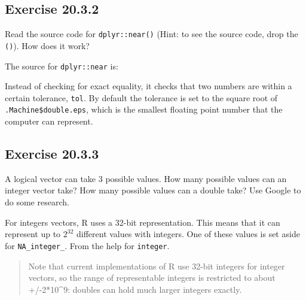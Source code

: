 \documentclass[]{book}
\newenvironment{Shaded}{\begin{snugshade}}{\end{snugshade}}
\newcommand{\CommentTok}[1]{\textcolor[rgb]{0.56,0.35,0.01}{\textit{#1}}}
\newcommand{\NormalTok}[1]{#1}
\newcommand{\OperatorTok}[1]{\textcolor[rgb]{0.81,0.36,0.00}{\textbf{#1}}}
\theoremstyle{plain}
\theoremstyle{remark}
\theoremstyle{definition}
\theoremstyle{definition}
\theoremstyle{definition}
\theoremstyle{remark}
\begin{document}
\hypertarget{exercise-20.3.2}{%
\subsection*{\texorpdfstring{Exercise
{20.3.2}}{Exercise 20.3.2}}\label{exercise-20.3.2}}

Read the source code for \texttt{dplyr::near()} (Hint: to see the source
code, drop the \texttt{()}). How does it work?

The source for \texttt{dplyr::near} is:

\begin{Shaded}
\end{Shaded}

Instead of checking for exact equality, it checks that two numbers are
within a certain tolerance, \texttt{tol}. By default the tolerance is
set to the square root of \texttt{.Machine\$double.eps}, which is the
smallest floating point number that the computer can represent.

\hypertarget{exercise-20.3.3}{%
\subsection*{\texorpdfstring{Exercise
{20.3.3}}{Exercise 20.3.3}}\label{exercise-20.3.3}}

A logical vector can take 3 possible values. How many possible values
can an integer vector take? How many possible values can a double take?
Use Google to do some research.

For integers vectors, R uses a 32-bit representation. This means that it
can represent up to \(2^32\) different values with integers. One of
these values is set aside for \texttt{NA\_integer\_}. From the help for
\texttt{integer}.

\begin{quote}
Note that current implementations of R use 32-bit integers for integer
vectors, so the range of representable integers is restricted to about
+/-2*10\^{}9: doubles can hold much larger integers exactly.
\end{quote}
\end{document}
